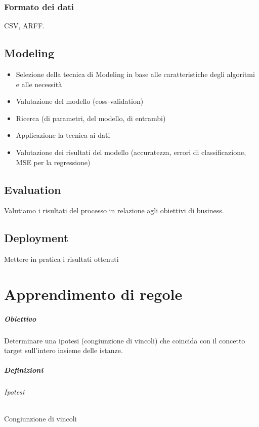 \documentclass[11pt,onecolumn,a4paper,oneside]{book}
\begin{document}
\subsection{Formato dei dati}
CSV, ARFF.

	\section{Modeling}
		\begin{itemize}
	\item Selezione della tecnica di Modeling in base alle caratteristiche degli algoritmi e alle necessità
	\item Valutazione del modello (coss-validation)
	\item Ricerca (di parametri, del modello, di entrambi)
	\item Applicazione la tecnica ai dati
	\item Valutazione dei risultati del modello (accuratezza, errori di classificazione, MSE per la regressione)
		\end{itemize}			
		
	\section{Evaluation}			
Valutiamo i risultati del processo in relazione agli obiettivi di business.

	\section{Deployment}	
		Mettere in pratica i risultati ottenuti
		
		
		
		
		
		
\chapter{Apprendimento di regole}

	\paragraph{Obiettivo}
	Determinare una ipotesi (congiunzione di vincoli) che coincida con il concetto target sull'intero insieme delle istanze.
	
	\paragraph{Definizioni}
		\subparagraph{Ipotesi} Congiunzione di vincoli
		
\end{document}
